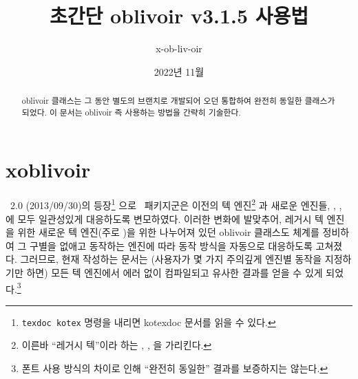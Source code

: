\documentclass[
	12pt,
	a4paper,
	kosection,
	footnote,
	nobookmarks,
	microtype,
	figtabcapt,
]{oblivoir}
\newcommand\xobclass{x\-ob\-liv\-oir\oblivoirallowbreak}
\newcommand\obclass{ob\-liv\-oir\oblivoirallowbreak}
\begin{document}
\title{초간단 \obclass{} v3.1.5 사용법}

\date{2022년 11월}

\author{x-ob-liv-oir}

\maketitle

\begin{abstract}
\obclass{} 클래스는 그 동안 별도의 브랜치로 개발되어 오던
  통합하여 완전히 동일한 클래스가 되었다.
이 문서는 \obclass{} 즉 
사용하는 방법을 간략히 기술한다.
\end{abstract}

\tableofcontents*

\clearpage

\section{ \xobclass{}}


\koTeX\ 2.0 (2013/09/30)의 등장\footnote{%
	\texttt{texdoc kotex} 명령을 내리면 kotexdoc 문서를 읽을 수 있다.}%
으로 \koTeX\ 패키지군은 이전의 텍 엔진\footnote{%
	이른바 ``레거시 텍''이라 하는 , , 을
	가리킨다.}%
과 새로운 엔진들, , ,
에 모두 일관성있게 대응하도록 변모하였다.
이러한 변화에 발맞추어, 레거시 텍 엔진을 위한  새로운 텍 엔진(주로 )을 위한 
나누어져 있던 oblivoir 클래스도 체계를 정비하여 그 구별을 없애고 동작하는 엔진에 따라 동작 방식을
자동으로 대응하도록 고쳐졌다. 그러므로, 현재  작성하는 문서는 
(사용자가 몇 가지 주의깊게 엔진별 동작을 지정하기만 하면) 모든 텍 엔진에서 에러 없이 컴파일되고
유사한 결과를 얻을 수 있게 되었다.\footnote{%
	폰트 사용 방식의 차이로 인해 ``완전히 동일한'' 결과를 보증하지는 않는다.}
\end{document}
